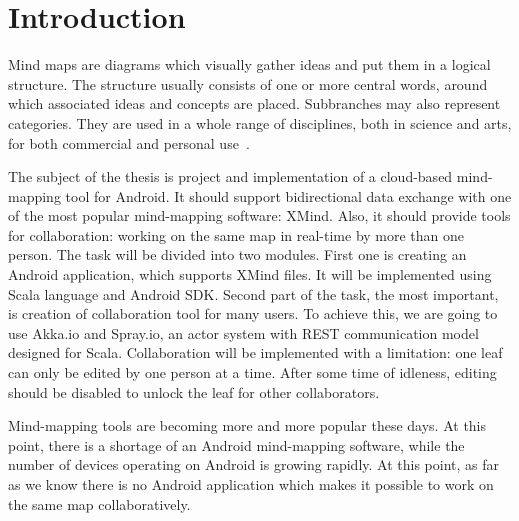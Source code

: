 %
%
%
%
%

\chapter{Introduction}
\label{chap:introduction}


Mind maps are diagrams which visually gather ideas and put them in a logical structure. The structure usually consists of one or more central words, around which associated ideas and concepts are placed. Subbranches may also represent categories. They are used in a whole range of disciplines, both in science and arts, for both commercial and personal use~\cite{Gee:2010:Roots}.


The subject of the thesis is project and implementation of a cloud-based mind-mapping tool for Android. It should support bidirectional data exchange with one of the most popular mind-mapping software: XMind. Also, it should provide tools for collaboration: working on the same map in real-time by more than one person. The task will be divided into two modules. First one is creating an Android application, which supports XMind files. It will be implemented using Scala language and Android SDK. Second part of the task, the most important, is creation of collaboration tool for many users. To achieve this, we are going to use Akka.io and Spray.io, an actor system with REST communication model designed for Scala. Collaboration will be implemented with a limitation: one leaf can only be edited by one person at a time. After some time of idleness, editing should be disabled to unlock the leaf for other collaborators.


Mind-mapping tools are becoming more and more popular these days. At this point, there is a shortage of an Android mind-mapping software, while the number of devices operating on Android is growing rapidly. At this point, as far as we know there is no Android application which makes it possible to work on the same map collaboratively.

